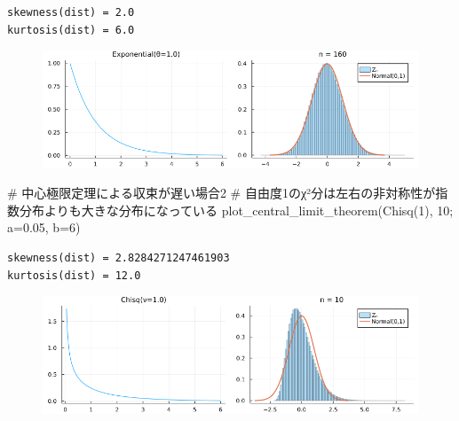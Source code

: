 \documentclass[
  letterpaper,
  DIV=11,
  numbers=noendperiod]{scrartcl}
\newenvironment{Shaded}{\begin{snugshade}}{\end{snugshade}}
\newcommand{\CommentTok}[1]{\textcolor[rgb]{0.37,0.37,0.37}{#1}}
\newcommand{\FloatTok}[1]{\textcolor[rgb]{0.68,0.00,0.00}{#1}}
\newcommand{\FunctionTok}[1]{\textcolor[rgb]{0.28,0.35,0.67}{#1}}
\newcommand{\NormalTok}[1]{\textcolor[rgb]{0.00,0.23,0.31}{#1}}
\newcommand{\OperatorTok}[1]{\textcolor[rgb]{0.37,0.37,0.37}{#1}}
\begin{document}
\begin{verbatim}
skewness(dist) = 2.0
kurtosis(dist) = 6.0
\end{verbatim}

\begin{figure}[H]

{\centering \includegraphics{05 Central limit theorem_files/figure-pdf/cell-83-output-2.png}

}

\end{figure}

\begin{Shaded}
\begin{Highlighting}[]
\CommentTok{\# 中心極限定理による収束が遅い場合2}
\CommentTok{\# 自由度1のχ²分は左右の非対称性が指数分布よりも大きな分布になっている}
\FunctionTok{plot\_central\_limit\_theorem}\NormalTok{(}\FunctionTok{Chisq}\NormalTok{(}\FloatTok{1}\NormalTok{), }\FloatTok{10}\NormalTok{; a}\OperatorTok{=}\FloatTok{0.05}\NormalTok{, b}\OperatorTok{=}\FloatTok{6}\NormalTok{)}
\end{Highlighting}
\end{Shaded}

\begin{verbatim}
skewness(dist) = 2.8284271247461903
kurtosis(dist) = 12.0
\end{verbatim}

\begin{figure}[H]

{\centering \includegraphics{05 Central limit theorem_files/figure-pdf/cell-84-output-2.png}

}

\end{figure}
\end{document}
